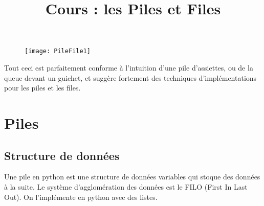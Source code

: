 \documentclass[12pt,fleqn]{article} %
\begin{document}
\title{Cours : les Piles et Files}
\maketitle



\begin{figure}[h!]
	\begin{center}
		\texttt{[image: PileFile1]}
	\end{center}
\end{figure}


Tout ceci est parfaitement conforme à l’intuition d’une pile d’assiettes, ou de la queue devant un guichet, et suggère fortement des techniques d’implémentations pour les piles et les files.


\section{Piles}

\subsection{Structure de données}

Une pile en python est une structure de données variables qui stoque des données à la suite. Le système d'agglomération des données est le FILO (First In Last Out). On l'implémente en python avec des listes. \\
\end{document}
